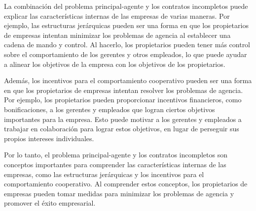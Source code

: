 \documentclass[11pt]{article}
\begin{document}
\begin{flushleft}
    La combinación del problema principal-agente y los contratos incompletos puede explicar las características internas de las empresas de varias maneras. Por ejemplo, las estructuras jerárquicas pueden ser una forma en que los propietarios de empresas intentan minimizar los problemas de agencia al establecer una cadena de mando y control. Al hacerlo, los propietarios pueden tener más control sobre el comportamiento de los gerentes y otros empleados, lo que puede ayudar a alinear los objetivos de la empresa con los objetivos de los propietarios.

    Además, los incentivos para el comportamiento cooperativo pueden ser una forma en que los propietarios de empresas intentan resolver los problemas de agencia. Por ejemplo, los propietarios pueden proporcionar incentivos financieros, como bonificaciones, a los gerentes y empleados que logran ciertos objetivos importantes para la empresa. Esto puede motivar a los gerentes y empleados a trabajar en colaboración para lograr estos objetivos, en lugar de perseguir sus propios intereses individuales.

    Por lo tanto, el problema principal-agente y los contratos incompletos son conceptos importantes para comprender las características internas de las empresas, como las estructuras jerárquicas y los incentivos para el comportamiento cooperativo. Al comprender estos conceptos, los propietarios de empresas pueden tomar medidas para minimizar los problemas de agencia y promover el éxito empresarial.
\end{flushleft}
\end{document}

